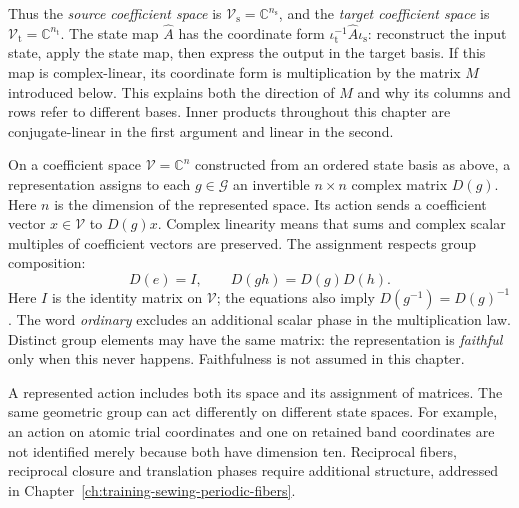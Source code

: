 Thus the \emph{source coefficient space} is
$\mathcal V_{\mathrm s}=\mathbb C^{n_{\mathrm s}}$, and the
\emph{target coefficient space} is
$\mathcal V_{\mathrm t}=\mathbb C^{n_{\mathrm t}}$. The state map
$\widehat A$ has the coordinate form
$\iota_{\mathrm t}^{-1}\widehat A\iota_{\mathrm s}$: reconstruct the input
state, apply the state map, then express the output in the target basis.
If this map is complex-linear, its coordinate form is multiplication by the
matrix $M$ introduced below. This explains both the direction of $M$ and why
its columns and rows refer to different bases. Inner products throughout this
chapter are conjugate-linear in the first argument and linear in the second.

\begin{definition}
\label{def:symmetry-ordinary-representation}
On a coefficient space $\mathcal V=\mathbb C^n$ constructed from an ordered
state basis as above, a representation assigns to each $g\in\mathcal G$
an invertible $n\times n$ complex matrix $D(g)$. Here $n$ is the dimension
of the represented space. Its action sends a coefficient vector
$x\in\mathcal V$ to $D(g)x$. Complex linearity means that sums and complex
scalar multiples of coefficient vectors are preserved. The assignment
respects group composition:
\begin{equation}
  D(e)=I,\qquad D(gh)=D(g)D(h).
  \label{eq:symmetry-ordinary-law}
\end{equation}
Here $I$ is the identity matrix on $\mathcal V$; the equations also imply
$D(g^{-1})=D(g)^{-1}$. The word \emph{ordinary} excludes an additional scalar
phase in the multiplication law. Distinct group elements may have the same
matrix: the representation is \emph{faithful} only when this never happens.
Faithfulness is not assumed in this chapter.
\end{definition}

A represented action includes both its space and its assignment of matrices.
The same geometric group can act differently on different state spaces.
For example, an action on atomic trial coordinates and one on retained band
coordinates are not identified merely because both have dimension ten.
Reciprocal fibers, reciprocal closure and translation phases require additional
structure, addressed in Chapter~\ref{ch:training-sewing-periodic-fibers}.


